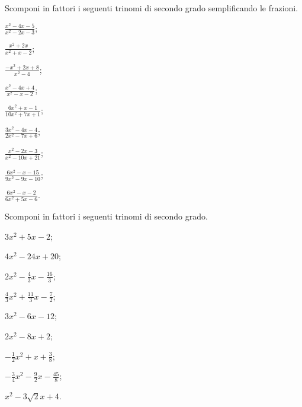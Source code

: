
\begin{esercizio}[\Ast]
 \label{ese:3.95} %
Scomponi in fattori i seguenti trinomi di secondo grado semplificando le frazioni.
\begin{multicols}{3}
\begin{enumeratea}
\item $\frac{x^{2}-4x-5}{x^{2}-2x-3}$;
\item $\frac{x^{2}+2x}{x^{2}+x-2}$;
\item $\frac{-x^{2}+2x+8}{x^{2}-4}$;
\item $\frac{x^{2}-4x+4}{x^{2}-x-2}$;
\item $\frac{6x^{2}+x-1}{10x^{2}+7x+1}$;
\item $\frac{3x^{2}-4x-4}{2x^{2}-7x+6}$;
\item $\frac{x^{2}-2x-3}{x^{2}-10x+21}$;
\item $\frac{6x^{2}-x-15}{9x^{2}-9x-10}$;
\item $\frac{6x^{2}-x-2}{6x^{2}+5x-6}$.
\end{enumeratea}
\end{multicols}
\end{esercizio}

\begin{esercizio}[\Ast]
 \label{ese:3.96}
Scomponi in fattori i seguenti trinomi di secondo grado.
\begin{multicols}{3}
\begin{enumeratea}
\item $3 x^{2} + 5 x - 2$;
\item $4 x^{2}-24 x + 20$;
\item $2 x^{2}-\frac{4}{3} x - \frac{16}{3}$;
\item $\frac{4}{3} x^{2} + \frac{11}{3} x - \frac{7}{2}$;
\item $3 x^{2}-6 x-12$;
\item $2 x^{2}-8 x + 2$;
\item $- \frac{1}{2} x^{2} + x + \frac{3}{8}$;
\item $- \frac{3}{4} x^{2}-\frac{9}{2} x - \frac{45}{8}$;
\item $x^{2}-3\sqrt{2} x +4$.
\end{enumeratea}
\end{multicols}
\end{esercizio}

